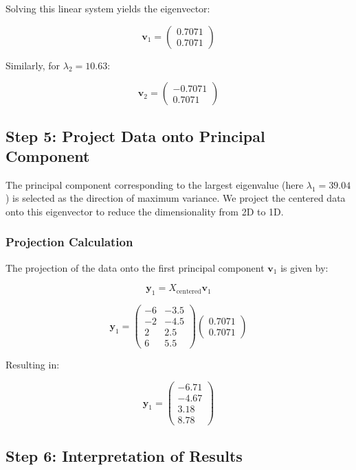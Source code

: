 \documentclass{exam}
\begin{document}
Solving this linear system yields the eigenvector:

\[
\mathbf{v}_1 = \begin{pmatrix} 0.7071 \\ 0.7071 \end{pmatrix}
\]

Similarly, for \( \lambda_2 = 10.63 \):

\[
\mathbf{v}_2 = \begin{pmatrix} -0.7071 \\ 0.7071 \end{pmatrix}
\]

\subsection{Step 5: Project Data onto Principal Component}

The principal component corresponding to the largest eigenvalue (here \( \lambda_1 = 39.04 \)) is selected as the direction of maximum variance. We project the centered data onto this eigenvector to reduce the dimensionality from 2D to 1D.

\subsubsection*{Projection Calculation}

The projection of the data onto the first principal component \( \mathbf{v}_1 \) is given by:

\[
\mathbf{y}_1 = X_{\text{centered}} \mathbf{v}_1
\]

\[
\mathbf{y}_1 = \begin{pmatrix} -6 & -3.5 \\ -2 & -4.5 \\ 2 & 2.5 \\ 6 & 5.5 \end{pmatrix} \begin{pmatrix} 0.7071 \\ 0.7071 \end{pmatrix}
\]

Resulting in:

\[
\mathbf{y}_1 = \begin{pmatrix} -6.71 \\ -4.67 \\ 3.18 \\ 8.78 \end{pmatrix}
\]

\subsection{Step 6: Interpretation of Results}
\end{document}
